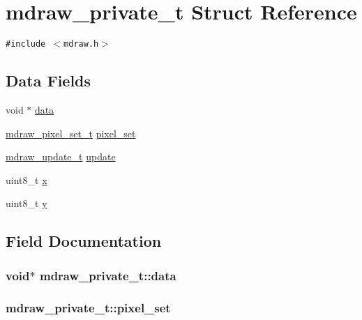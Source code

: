 \hypertarget{structmdraw__private__t}{
\section{mdraw\_\-private\_\-t Struct Reference}
\label{structmdraw__private__t}
}
{\tt \#include $<$mdraw.h$>$}

\subsection*{Data Fields}
\begin{CompactItemize}
\item 
void $\ast$ \hyperlink{structmdraw__private__t_3c8d37a1cb056e3bd798f44a81195430}{data}
\item 
\hyperlink{mdraw_8h_4fa9e0ad77f715a115bde75e0cee634b}{mdraw\_\-pixel\_\-set\_\-t} \hyperlink{structmdraw__private__t_ec8099c9d7dc3dab32e61dba339eed41}{pixel\_\-set}
\item 
\hyperlink{mdraw_8h_538479335587d00aa8b7d2491d25f657}{mdraw\_\-update\_\-t} \hyperlink{structmdraw__private__t_d5f03b668e3d05f874a444139012e770}{update}
\item 
uint8\_\-t \hyperlink{structmdraw__private__t_adf8e80dbbed2ccb09cd4976bbe4bf29}{x}
\item 
uint8\_\-t \hyperlink{structmdraw__private__t_da1b1d57274b60d599b0c069e91ca177}{y}
\end{CompactItemize}


\subsection{Field Documentation}
\hypertarget{structmdraw__private__t_3c8d37a1cb056e3bd798f44a81195430}{
\subsubsection{\setlength{\rightskip}{0pt plus 5cm}void$\ast$ {\bf mdraw\_\-private\_\-t::data}}}
\label{structmdraw__private__t_3c8d37a1cb056e3bd798f44a81195430}


\hypertarget{structmdraw__private__t_ec8099c9d7dc3dab32e61dba339eed41}{
\subsubsection{ {\bf mdraw\_\-private\_\-t::pixel\_\-set}}}
\label{structmdraw__private__t_ec8099c9d7dc3dab32e61dba339eed41}



